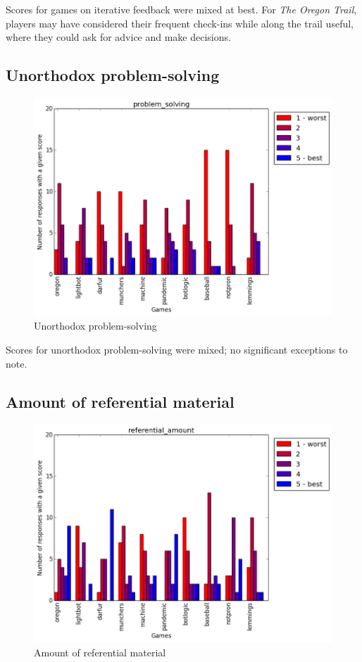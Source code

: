 				Scores for games on iterative feedback were mixed at best. For \textit{The Oregon Trail}, players may have considered their frequent check-ins while along the trail useful, where they could ask for advice and make decisions.

			\subsection{Unorthodox problem-solving}
				\begin{figure}[] 
				\centering 
				\includegraphics[width=\textwidth, height=.4\textheight, keepaspectratio=true]{problem_solving_scores.png} 
				\caption{Unorthodox problem-solving}
				\end{figure}

				Scores for unorthodox problem-solving were mixed; no significant exceptions to note.

			\subsection{Amount of referential material}
				\begin{figure}[] 
				\centering 
				\includegraphics[width=\textwidth, height=.4\textheight, keepaspectratio=true]{referential_amount_scores.png} 
				\caption{Amount of referential material}
				\end{figure}


